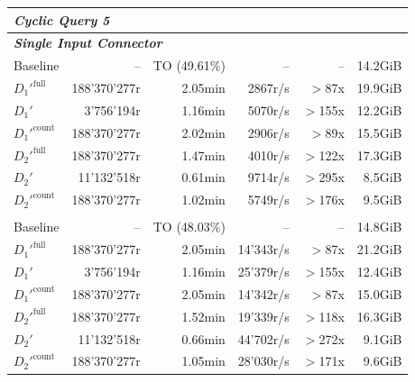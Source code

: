 \begin{longtable}{lrrrrr}
    \multicolumn{6}{l}{\textit{Cyclic Query 5}} \\
    \midrule
    \multicolumn{6}{l}{\textit{\textbf{Single Input Connector}}} \\
    \nopagebreak
    Baseline              &  --                   &  TO (49.61\%)       &  --                  & --                & 14.2GiB   \\
    $D_1'^{\text{full}}$   &  188'370'277r         &  2.05min            &  2867r/s             & $>$87x            & 19.9GiB   \\
    \quad $D_1'$           &  3'756'194r           &  1.16min            &  5070r/s             & $>$155x           & 12.2GiB   \\
    $D_1'^{\text{count}}$  &  188'370'277r         &  2.02min            &  2906r/s             & $>$89x            & 15.5GiB   \\
    $D_2'^{\text{full}}$   &  188'370'277r         &  1.47min            &  4010r/s             & $>$122x           & 17.3GiB   \\
    \quad $D_2'$           &  11'132'518r          &  0.61min            &  9714r/s             & $>$295x           & 8.5GiB    \\
    $D_2'^{\text{count}}$  &  188'370'277r         &  1.02min            &  5749r/s             & $>$176x           & 9.5GiB    \\
    \addlinespace 
    
    \multicolumn{6}{l}{\textit{\textbf{5 Input Connectors}}} \\
    \nopagebreak
    Baseline              &  --                   &  TO (48.03\%)       &  --                 & --                & 14.8GiB   \\
    $D_1'^{\text{full}}$   &  188'370'277r         &  2.05min            &  14'343r/s          & $>$87x            & 21.2GiB   \\
    \quad $D_1'$           &  3'756'194r           &  1.16min            &  25'379r/s          & $>$155x           & 12.4GiB   \\
    $D_1'^{\text{count}}$  &  188'370'277r         &  2.05min            &  14'342r/s          & $>$87x            & 15.0GiB   \\
    $D_2'^{\text{full}}$   &  188'370'277r         &  1.52min            &  19'339r/s          & $>$118x           & 16.3GiB   \\
    \quad $D_2'$           &  11'132'518r          &  0.66min            &  44'702r/s          & $>$272x           & 9.1GiB    \\
    $D_2'^{\text{count}}$  &  188'370'277r         &  1.05min            &  28'030r/s          & $>$171x           & 9.6GiB    \\
    \midrule
    

\end{longtable}
